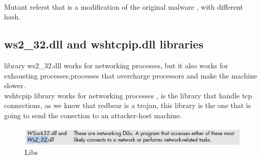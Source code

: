 \documentclass[10pt,a4paper]{article} %
\begin{document}
            \\
            Mutant referst that is a modification of the original malware ,
            with different hash.
            \subsection{\color{red} ws2\_32.dll and wshtcpip.dll \color{black}  libraries}
                library ws2\_32.dll works for networking processes, but it also
                works for exhausting processes,processes that overcharge
                processors and make the machine slower.
                \\ wshtcpip library works for networking processes , is the
                library that handle tcp connections, as we know that redbear is
                a trojan, this library is the one that is going to send the
                conection to an attacker-host machine.
                \begin{figure}[h!]
                    \centering
                    \includegraphics[width=0.9\linewidth]{libs.jpeg}
                    \caption{Libs}
                    \label{fig:libs}
                \end{figure}























    \nocite{*}
    
    
\end{document}
